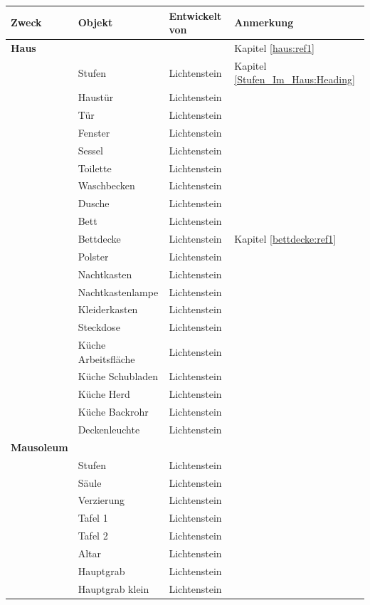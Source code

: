 \begin{tabular}{l|l|l|l}
    \textbf{Zweck} & \textbf{Objekt} & \textbf{Entwickelt von} & \textbf{Anmerkung} \\
    \hline
    \textbf{Haus} &  &  & Kapitel \ref{haus:ref1}\\
    \hline
    & Stufen & Lichtenstein & Kapitel \ref{Stufen_Im_Haus:Heading}\\
    & Haustür & Lichtenstein & \\
    & Tür & Lichtenstein & \\
    & Fenster & Lichtenstein & \\
    & Sessel & Lichtenstein & \\
    & Toilette & Lichtenstein & \\
    & Waschbecken & Lichtenstein & \\
    & Dusche & Lichtenstein & \\
    & Bett & Lichtenstein & \\
    & Bettdecke & Lichtenstein & Kapitel \ref{bettdecke:ref1}\\
    & Polster & Lichtenstein & \\
    & Nachtkasten & Lichtenstein & \\
    & Nachtkastenlampe & Lichtenstein & \\
    & Kleiderkasten & Lichtenstein & \\
    & Steckdose & Lichtenstein & \\
    & Küche Arbeitsfläche & Lichtenstein & \\
    & Küche Schubladen & Lichtenstein & \\
    & Küche Herd & Lichtenstein & \\
    & Küche Backrohr & Lichtenstein & \\
    & Deckenleuchte & Lichtenstein & \\
    \hline
    \textbf{Mausoleum} &  &  & \\
    \hline
    & Stufen & Lichtenstein & \\
    & Säule & Lichtenstein & \\
    & Verzierung & Lichtenstein & \\
    & Tafel 1 & Lichtenstein & \\
    & Tafel 2 & Lichtenstein & \\
    & Altar & Lichtenstein & \\
    & Hauptgrab & Lichtenstein & \\
    & Hauptgrab klein & Lichtenstein & \\

\end{tabular}
